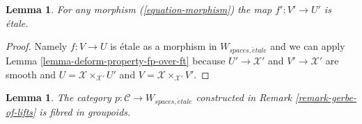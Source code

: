 \documentclass{stacks-project}
\theoremstyle{plain}
\newtheorem{lemma}[subsection]{Lemma}
\theoremstyle{definition}
\theoremstyle{remark}
\numberwithin{equation}{subsection}
\def\etale{{\acute{e}tale}}
\begin{document}
\begin{lemma}
\label{lemma-morphisms-lifts-etale}
For any morphism (\ref{equation-morphism}) the map $f' : V' \to U'$ is \'etale.
\end{lemma}

\begin{proof}
Namely $f : V \to U$ is \'etale as a morphism in $W_{spaces, \etale}$
and we can apply
Lemma \ref{lemma-deform-property-fp-over-ft} because $U' \to \mathcal{X}'$
and $V' \to \mathcal{X}'$ are smooth and
$U = \mathcal{X} \times_{\mathcal{X}'} U'$ and
$V = \mathcal{X} \times_{\mathcal{X}'} V'$.
\end{proof}

\begin{lemma}
\label{lemma-gerbe-of-lifts-fibred}
The category $p : \mathcal{C} \to W_{spaces, \etale}$ constructed
in Remark \ref{remark-gerbe-of-lifts} is fibred in groupoids.
\end{lemma}
\end{document}
